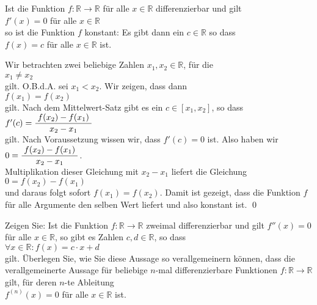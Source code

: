 \begin{Lemma} \label{lemma:0_ableitung}
Ist die Funktion $f:\mathbb{R} \rightarrow \mathbb{R}$ f\"ur alle $x \in \mathbb{R}$
differenzierbar und gilt
\\[0.2cm]
\hspace*{1.3cm}
$f'(x) = 0$ \quad f\"ur alle $x \in \mathbb{R}$
\\[0.2cm]
so ist die Funktion $f$ konstant:  Es gibt dann ein $c \in \mathbb{R}$ so dass
\\[0.2cm]
\hspace*{1.3cm}
$f(x) = c$ \quad f\"ur alle $x \in \mathbb{R}$ ist.
\end{Lemma}

\proof
Wir betrachten zwei beliebige Zahlen $x_1, x_2\in \mathbb{R}$, f\"ur die
\\[0.2cm]
\hspace*{1.3cm}
$x_1 \not= x_2$ 
\\[0.2cm]
gilt.  O.B.d.A. sei $x_1 < x_2$.  Wir zeigen, dass dann 
\\[0.2cm]
\hspace*{1.3cm}
$f(x_1) = f(x_2)$
\\[0.2cm]
gilt.  Nach dem Mittelwert-Satz gibt es ein $c \in [x_1,x_2]$, so dass
\\[0.2cm]
\hspace*{1.3cm}
$f'(c) = \displaystyle\frac{\;\displaystyle f(x_2) - f(x_1)\;}{\;\displaystyle x_2 - x_1\;}$ 
\\[0.2cm]
gilt.  Nach Voraussetzung wissen wir, dass $f'(c) = 0$ ist.  Also haben wir
\\[0.2cm]
\hspace*{1.3cm}
$0 = \displaystyle\frac{\;\displaystyle f(x_2) - f(x_1)\;}{\;\displaystyle x_2 - x_1\;}$.
\\[0.2cm]
Multiplikation dieser Gleichung mit $x_2 - x_1$ liefert die Gleichung
\\[0.2cm]
\hspace*{1.3cm}
$0 = f(x_2) - f(x_1)$
\\[0.2cm]
und daraus folgt sofort $f(x_1) = f(x_2)$.  Damit ist gezeigt, dass die Funktion $f$ f\"ur alle
Argumente den selben Wert liefert und also konstant ist. \qed

\exercise
Zeigen Sie: Ist die Funktion $f:\mathbb{R} \rightarrow \mathbb{R}$ zweimal differenzierbar und gilt
$f''(x) = 0$ f\"ur alle $x \in \mathbb{R}$, so gibt es Zahlen $c,d \in \mathbb{R}$, so dass 
\\[0.2cm]
\hspace*{1.3cm}
$\forall x \in \mathbb{R}: f(x) = c \cdot x + d$
\\[0.2cm]
gilt.  \"Uberlegen  Sie, wie Sie diese Aussage so verallgemeinern k\"onnen, dass die verallgemeinerte Aussage
f\"ur beliebige $n$-mal differenzierbare 
Funktionen $f:\mathbb{R} \rightarrow \mathbb{R}$ gilt, f\"ur deren $n$-te Ableitung 
\\[0.2cm]
\hspace*{1.3cm}
$f^{(n)}(x) = 0$ \quad f\"ur alle $x \in \mathbb{R}$ ist.  \eox
\pagebreak

